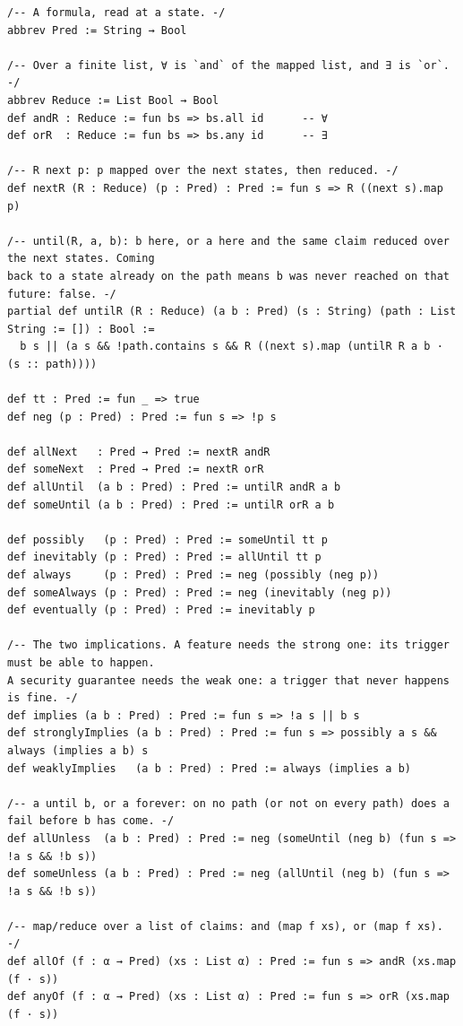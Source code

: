 \begin{lstlisting}[language=Lean,basicstyle=\ttfamily\footnotesize]
/-- A formula, read at a state. -/
abbrev Pred := String → Bool

/-- Over a finite list, ∀ is `and` of the mapped list, and ∃ is `or`. -/
abbrev Reduce := List Bool → Bool
def andR : Reduce := fun bs => bs.all id      -- ∀
def orR  : Reduce := fun bs => bs.any id      -- ∃

/-- R next p: p mapped over the next states, then reduced. -/
def nextR (R : Reduce) (p : Pred) : Pred := fun s => R ((next s).map p)

/-- until(R, a, b): b here, or a here and the same claim reduced over the next states. Coming
back to a state already on the path means b was never reached on that future: false. -/
partial def untilR (R : Reduce) (a b : Pred) (s : String) (path : List String := []) : Bool :=
  b s || (a s && !path.contains s && R ((next s).map (untilR R a b · (s :: path))))

def tt : Pred := fun _ => true
def neg (p : Pred) : Pred := fun s => !p s

def allNext   : Pred → Pred := nextR andR
def someNext  : Pred → Pred := nextR orR
def allUntil  (a b : Pred) : Pred := untilR andR a b
def someUntil (a b : Pred) : Pred := untilR orR a b

def possibly   (p : Pred) : Pred := someUntil tt p
def inevitably (p : Pred) : Pred := allUntil tt p
def always     (p : Pred) : Pred := neg (possibly (neg p))
def someAlways (p : Pred) : Pred := neg (inevitably (neg p))
def eventually (p : Pred) : Pred := inevitably p

/-- The two implications. A feature needs the strong one: its trigger must be able to happen.
A security guarantee needs the weak one: a trigger that never happens is fine. -/
def implies (a b : Pred) : Pred := fun s => !a s || b s
def stronglyImplies (a b : Pred) : Pred := fun s => possibly a s && always (implies a b) s
def weaklyImplies   (a b : Pred) : Pred := always (implies a b)

/-- a until b, or a forever: on no path (or not on every path) does a fail before b has come. -/
def allUnless  (a b : Pred) : Pred := neg (someUntil (neg b) (fun s => !a s && !b s))
def someUnless (a b : Pred) : Pred := neg (allUntil (neg b) (fun s => !a s && !b s))

/-- map/reduce over a list of claims: and (map f xs), or (map f xs). -/
def allOf (f : α → Pred) (xs : List α) : Pred := fun s => andR (xs.map (f · s))
def anyOf (f : α → Pred) (xs : List α) : Pred := fun s => orR (xs.map (f · s))
\end{lstlisting}
